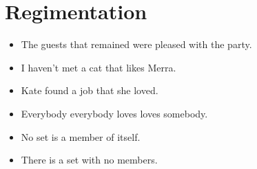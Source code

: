 \documentclass[a4paper, 11pt]{article} %
\newcommand{\tuple}[1]{\langle#1\rangle} %
\def\therefore{\ensuremath{\ldotp\dot\,\ldotp}}
\newcommand{\I}{\mathcal{I}}
\newcommand{\VV}[2]{\mathcal{V}_{#1}^{#2}} %
\begin{document}
\begin{enumerate}
\end{enumerate}





\section*{Regimentation}

  \begin{itemize}
    \item The guests that remained were pleased with the party.
    \item I haven't met a cat that likes Merra.
    \item Kate found a job that she loved.
    \item Everybody everybody loves loves somebody.
    \item No set is a member of itself.
    \item There is a set with no members.
  \end{itemize}
\end{document}
